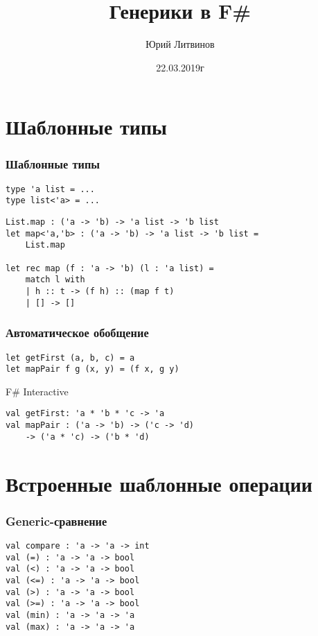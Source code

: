\documentclass[xetex,mathserif,serif]{beamer}
\title{Генерики в F\#}
\author{Юрий Литвинов}
\date{22.03.2019г}
\begin{document}
	
	\frame{\titlepage}
	
	\section{Шаблонные типы}
	
	\begin{frame}[fragile]
		\frametitle{Шаблонные типы}
		\begin{verbatim}
type 'a list = ...
type list<'a> = ...
		\end{verbatim}

		\begin{verbatim}
List.map : ('a -> 'b) -> 'a list -> 'b list
let map<'a,'b> : ('a -> 'b) -> 'a list -> 'b list = 
    List.map

let rec map (f : 'a -> 'b) (l : 'a list) =
    match l with
    | h :: t -> (f h) :: (map f t)
    | [] -> []
		\end{verbatim}
	\end{frame}

	\begin{frame}[fragile]
		\frametitle{Автоматическое обобщение}
		\begin{verbatim}
let getFirst (a, b, c) = a
let mapPair f g (x, y) = (f x, g y)
		\end{verbatim}

		\begin{alertblock}{F\# Interactive}
			\begin{verbatim}
val getFirst: 'a * 'b * 'c -> 'a
val mapPair : ('a -> 'b) -> ('c -> 'd) 
    -> ('a * 'c) -> ('b * 'd)
			\end{verbatim}
		\end{alertblock}
	\end{frame}
	
	\section{Встроенные шаблонные операции}

	\begin{frame}[fragile]
		\frametitle{Generic-сравнение}
		\begin{verbatim}
val compare : 'a -> 'a -> int
val (=) : 'a -> 'a -> bool
val (<) : 'a -> 'a -> bool
val (<=) : 'a -> 'a -> bool
val (>) : 'a -> 'a -> bool
val (>=) : 'a -> 'a -> bool
val (min) : 'a -> 'a -> 'a
val (max) : 'a -> 'a -> 'a
		\end{verbatim}
	\end{frame}
\end{document}
